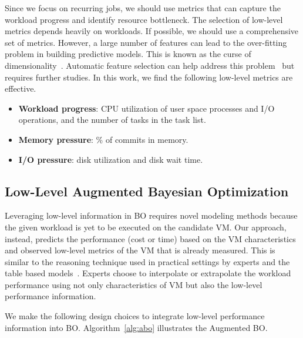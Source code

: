 Since we focus on recurring jobs, we should use metrics that can capture the workload progress and identify resource bottleneck.
The selection of low-level metrics depends heavily on workloads.
If possible, we should use a comprehensive set of metrics.
However, a large number of features can lead to the over-fitting problem in building predictive models.
This is known as the curse of dimensionality~\cite{domingos2012few}.
Automatic feature selection can help address this problem~\cite{guyon2003introduction, Hsu2016} but requires further studies.
In this work, we find the following low-level metrics are effective.


\begin{itemize}
    \item \textbf{Workload progress}: CPU utilization of user space processes and I/O operations, and the number of tasks in the task list.
    \item \textbf{Memory pressure}: \% of commits in memory.
    \item \textbf{I/O pressure}: disk utilization and disk wait time.
\end{itemize}

\subsection*{Low-Level Augmented Bayesian Optimization}

Leveraging low-level information in BO requires novel modeling methods because the given workload is yet to be executed on the candidate VM. Our approach, instead, predicts the performance (cost or time) based on the VM characteristics and observed low-level metrics of the VM that is already measured. This is similar to the reasoning technique used in practical settings by experts and the table based models~\cite{Anderson2001}. Experts choose to interpolate or extrapolate the workload performance using not only characteristics of VM but also the low-level performance information.

We make the following design choices to integrate low-level performance information into BO.
Algorithm~\ref{alg:abo} illustrates the Augmented BO.


